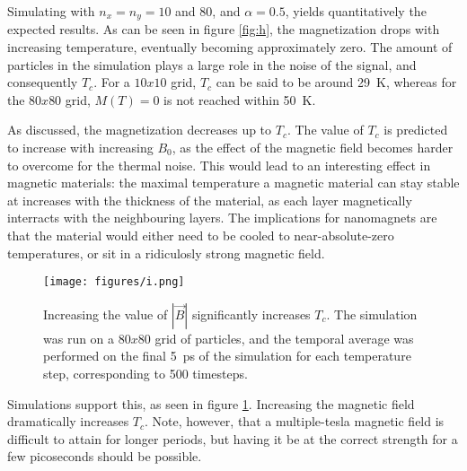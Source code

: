 Simulating with $n_x = n_y = 10$ and $80$, and $\alpha = 0.5$, yields quantitatively the expected results.
As can be seen in figure \ref{fig:h}, the magnetization drops with increasing temperature, 
eventually becoming approximately zero. 
The amount of particles in the simulation plays a large role in the noise of the signal, 
and consequently $T_c$. For a $10x10$ grid, $T_c$ can be said to be around \SI{29}{\kelvin},
whereas for the $80x80$ grid, $M(T)=0$ is not reached within \SI{50}{\kelvin}.

As discussed, the magnetization decreases up to $T_c$. 
The value of $T_c$ is predicted to increase with increasing $B_0$, 
as the effect of the magnetic field becomes harder to overcome for the thermal noise.
This would lead to an interesting effect in magnetic materials: 
the maximal temperature a magnetic material can stay stable at increases 
with the thickness of the material, 
as each layer magnetically interracts with the neighbouring layers.
The implications for nanomagnets are that the material would either need to be 
cooled to near-absolute-zero temperatures, or sit in a ridiculosly strong magnetic field.

\begin{figure}
    \centering
    \texttt{[image: figures/i.png]}
    \caption{
        Increasing the value of $|\vec{B}|$ significantly increases $T_c$.
        The simulation was run on a $80x80$ grid of particles, and the temporal
        average was performed on the final \SI{5}{\pico\second} of the simulation
        for each temperature step, corresponding to 500 timesteps. 
    }
    \label{fig:i}
\end{figure}

Simulations support this, as seen in figure \ref{fig:i}. 
Increasing the magnetic field dramatically increases $T_c$. 
Note, however, that a multiple-tesla magnetic field is difficult to attain for longer periods,
but having it be at the correct strength for a few picoseconds should be possible.

